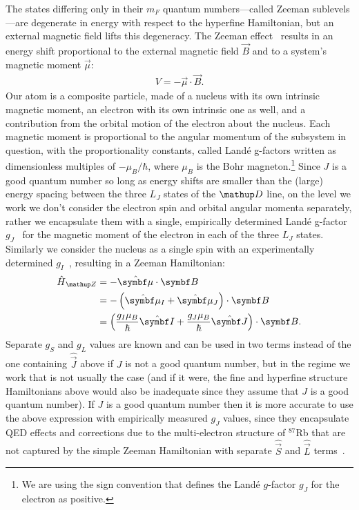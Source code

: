 The states differing only in their $m_F$ quantum numbers---called Zeeman sublevels---are degenerate in energy with respect to the hyperfine Hamiltonian, but an external magnetic field lifts this degeneracy. The Zeeman effect~\cite{zeeman_influence_1897, steck_rubidium_2015} results in an energy shift proportional to the external magnetic field $\vec B$ and to a system's magnetic moment $\vec \mu$:
\begin{align}
V = - \vec\mu\cdot\vec B.
\end{align}
Our atom is a composite particle, made of a nucleus with its own intrinsic magnetic moment, an electron with its own intrinsic one as well, and a contribution from the orbital motion of the electron about the nucleus. Each magnetic moment is proportional to the angular momentum of the subsystem in question, with the proportionality constants, called Land\'e g-factors written as dimensionless multiples of $-\mu_B/\hbar$, where $\mu_B$ is the Bohr magneton.\footnote{We are using the sign convention that defines the Land\'e $g$-factor $g_J$ for the electron as positive.} Since $J$ is a good quantum number so long as energy shifts are smaller than the (large) energy spacing between the three $L_J$ states of the $\up{D}$ line, on the level we work we don't consider the electron spin and orbital angular momenta separately, rather we encapsulate them with a single, empirically determined Land\'e g-factor $g_J$~\cite{steck_rubidium_2015} for the magnetic moment of the electron in each of the three $L_J$ states. Similarly we consider the nucleus as a single spin with an experimentally determined $g_I$~\cite{steck_rubidium_2015}, resulting in a Zeeman Hamiltonian:
\begin{align}
\hat H_\up{Z} & = -\hat{\vec \mu} \cdot \vec B\\
&= -\left(\hat{\vec \mu}_I + \hat{\vec \mu}_J\right) \cdot \vec B\\
&=\left(\frac{g_I\mu_B}{\hbar} \hat{\vec I} + \frac{g_J\mu_B}{\hbar} \hat{\vec J}\right) \cdot \vec B.\label{eq:H_Z}
\end{align}
Separate $g_S$ and $g_L$ values are known and can be used in two terms instead of the one containing $\hat{\vec J}$ above if $J$ is not a good quantum number, but in the regime we work that is not usually the case (and if it were, the fine and hyperfine structure Hamiltonians above would also be inadequate since they assume that $J$ is a good quantum number). If $J$ is a good quantum number then it is more accurate to use the above expression with empirically measured $g_J$ values, since they encapsulate QED effects and corrections due to the multi-electron structure of $^{87}$Rb that are not captured by the simple Zeeman Hamiltonian with separate $\hat{\vec S}$ and $\hat{\vec L}$ terms~\cite{steck_rubidium_2015}. 

